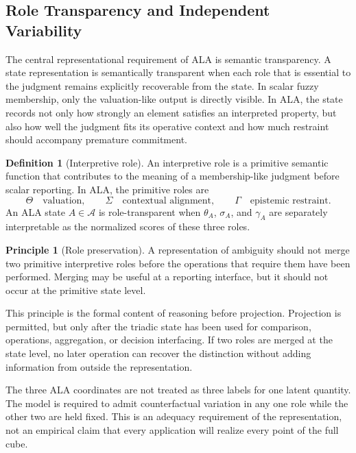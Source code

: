 \documentclass[reqno,final]{amsart}
\theoremstyle{definition}
\newtheorem{definition}{Definition}
\newtheorem{principle}{Principle}
\theoremstyle{plain}
\theoremstyle{remark}
\providecommand{\cA}{\mathcal{A}}
\begin{document}
\subsection{Role Transparency and Independent Variability}
\label{subsec:role-preservation}

The central representational requirement of ALA is semantic transparency. A state representation is semantically transparent when each role that is essential to the judgment remains explicitly recoverable from the state. In scalar fuzzy membership, only the valuation-like output is directly visible. In ALA, the state records not only how strongly an element satisfies an interpreted property, but also how well the judgment fits its operative context and how much restraint should accompany premature commitment.

\begin{definition}[Interpretive role]
An interpretive role is a primitive semantic function that contributes to the meaning of a membership-like judgment before scalar reporting. In ALA, the primitive roles are
\[
\Theta \quad \text{valuation}, \qquad
\Sigma \quad \text{contextual alignment}, \qquad
\Gamma \quad \text{epistemic restraint}.
\]
An ALA state \(A\in\cA\) is role-transparent when \(\theta_A\), \(\sigma_A\), and \(\gamma_A\) are separately interpretable as the normalized scores of these three roles.
\end{definition}

\begin{principle}[Role preservation]
A representation of ambiguity should not merge two primitive interpretive roles before the operations that require them have been performed. Merging may be useful at a reporting interface, but it should not occur at the primitive state level.
\end{principle}

This principle is the formal content of reasoning before projection. Projection is permitted, but only after the triadic state has been used for comparison, operations, aggregation, or decision interfacing. If two roles are merged at the state level, no later operation can recover the distinction without adding information from outside the representation.

The three ALA coordinates are not treated as three labels for one latent quantity. The model is required to admit counterfactual variation in any one role while the other two are held fixed. This is an adequacy requirement of the representation, not an empirical claim that every application will realize every point of the full cube.
\end{document}
